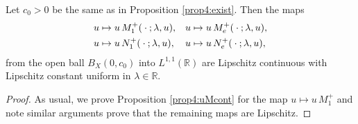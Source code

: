 \documentclass[../dissertation.tex]{subfiles}
\begin{document}
\begin{prop}\label{prop4:uMcont}
	Let $c_0 > 0$ be the same as in Proposition \ref{prop4:exist}. Then
	the maps
	\begin{align*}
		u &\mapsto u\, M_1^+(\kern 0.5ex \cdot \kern 0.5ex; \lambda, u ), &
		u &\mapsto u\, M_e^+(\kern 0.5ex \cdot \kern 0.5ex; \lambda, u ), \\ 
		u &\mapsto u\, N_1^+(\kern 0.5ex \cdot \kern 0.5ex; \lambda, u ), & 
		u &\mapsto u\, N_e^+(\kern 0.5ex \cdot \kern 0.5ex; \lambda, u ),
	\end{align*}
	from the open ball $B_X(0, c_0)$ into $L^{1,1}(\mathbb R)$ are 
	Lipschitz continuous with Lipschitz constant uniform in 
	$\lambda \in \mathbb R$.
\end{prop}
\begin{proof}
	As usual, we prove Proposition \ref{prop4:uMcont} for the map $u\mapsto u\, M_1^+$
	and note similar arguments prove that the remaining maps are Lipschitz.


\end{proof}
\end{document}
